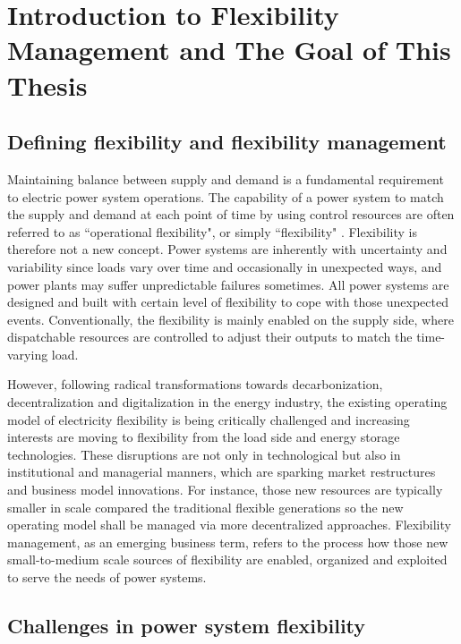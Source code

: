 \chapter{Introduction to Flexibility Management and The Goal of This Thesis}
\label{ch:introduction}
%
\section{Defining flexibility and flexibility management}
Maintaining balance between supply and demand is a fundamental requirement to electric power system operations. The capability of a power system to match the supply and demand at each point of time by using control resources are often referred to as ``operational flexibility", or simply ``flexibility" \cite{Cochran2014,Wang2017,Lund2015,Delft}. Flexibility is therefore not a new concept. Power systems are inherently with uncertainty and variability since loads vary over time and occasionally in unexpected ways, and power plants may suffer unpredictable failures sometimes. All power systems are designed and built with certain level of flexibility to cope with those unexpected events. Conventionally, the flexibility is mainly enabled on the supply side, where dispatchable resources are controlled to adjust their outputs to match the time-varying load.

However, following radical transformations towards decarbonization, decentralization and digitalization in the energy industry, the existing operating model of electricity flexibility is being critically challenged and increasing interests are moving to flexibility from the load side and energy storage technologies\cite{Lund2015,Bronski2015,McKinsey&Company2010}. These disruptions are not only in technological but also in institutional and managerial manners, which are sparking market restructures and business model innovations. For instance, those new resources are typically smaller in scale compared the traditional flexible generations so the new operating model shall be managed via more decentralized approaches. Flexibility management, as an emerging business term, refers to the process how those new small-to-medium scale sources of flexibility are enabled, organized and exploited to serve the needs of power systems.

\section{Challenges in power system flexibility}

